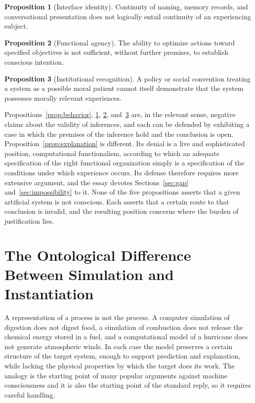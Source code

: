 \documentclass[12pt]{article}
\theoremstyle{definition}
\newtheorem{proposition}{Proposition}
\begin{document}
\begin{proposition}[Interface identity]\label{prop:identity}
Continuity of naming, memory records, and conversational presentation does not logically entail continuity of an experiencing subject.
\end{proposition}

\begin{proposition}[Functional agency]\label{prop:agency}
The ability to optimize actions toward specified objectives is not sufficient, without further premises, to establish conscious intention.
\end{proposition}

\begin{proposition}[Institutional recognition]\label{prop:institution}
A policy or social convention treating a system as a possible moral patient cannot itself demonstrate that the system possesses morally relevant experiences.
\end{proposition}

Propositions~\ref{prop:behavior}, \ref{prop:identity}, \ref{prop:agency}, and~\ref{prop:institution} are, in the relevant sense, negative claims about the validity of inferences, and each can be defended by exhibiting a case in which the premises of the inference hold and the conclusion is open. Proposition~\ref{prop:explanation} is different. Its denial is a live and sophisticated position, computational functionalism, according to which an adequate specification of the right functional organization simply is a specification of the conditions under which experience occurs. Its defense therefore requires more extensive argument, and the essay devotes Sections~\ref{sec:gap} and~\ref{sec:impossibility} to it. None of the five propositions asserts that a given artificial system is not conscious. Each asserts that a certain route to that conclusion is invalid, and the resulting position concerns where the burden of justification lies.

\section{The Ontological Difference Between Simulation and Instantiation}
\label{sec:simulation}

A representation of a process is not the process. A computer simulation of digestion does not digest food, a simulation of combustion does not release the chemical energy stored in a fuel, and a computational model of a hurricane does not generate atmospheric winds. In each case the model preserves a certain structure of the target system, enough to support prediction and explanation, while lacking the physical properties by which the target does its work. The analogy is the starting point of many popular arguments against machine consciousness and it is also the starting point of the standard reply, so it requires careful handling.
\end{document}
